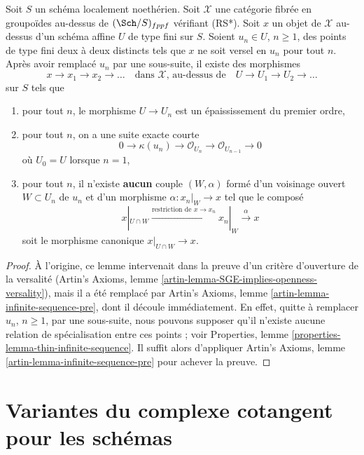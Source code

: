 \begin{lemma}
\label{lemma-infinite-sequence}
Soit $S$ un schéma localement noethérien. Soit $\mathcal{X}$ une catégorie
fibrée en groupoïdes au-dessus de $(\Sch/S)_{fppf}$ vérifiant (RS*).
Soit $x$ un objet de
$\mathcal{X}$ au-dessus d'un schéma affine $U$ de type fini sur $S$.
Soient $u_n \in U$, $n \geq 1$, des points de type fini deux à deux distincts
tels que $x$ ne soit versel en $u_n$ pour tout $n$. Après avoir remplacé
$u_n$ par une sous-suite, il existe des morphismes
$$
x \to x_1 \to x_2 \to \ldots
\quad\text{dans }\mathcal{X}\text{, au-dessus de}\quad
U \to U_1 \to U_2 \to \ldots
$$
sur $S$ tels que
\begin{enumerate}
\item pour tout $n$, le morphisme $U \to U_n$ est un épaississement
du premier ordre,
\item pour tout $n$, on a une suite exacte courte
$$
0 \to \kappa(u_n) \to \mathcal{O}_{U_n} \to \mathcal{O}_{U_{n - 1}} \to 0
$$
où $U_0 = U$ lorsque $n = 1$,
\item pour tout $n$, il n'existe {\bf aucun} couple $(W, \alpha)$
formé d'un voisinage ouvert $W \subset U_n$ de $u_n$
et d'un morphisme $\alpha : x_n|_W \to x$
tel que le composé
$$
x|_{U \cap W} \xrightarrow{\text{restriction de }x \to x_n}
x_n|_W \xrightarrow{\alpha} x
$$
soit le morphisme canonique $x|_{U \cap W} \to x$.
\end{enumerate}
\end{lemma}

\begin{proof}
À l'origine, ce lemme intervenait dans la preuve d'un critère
d'ouverture de la versalité
(Artin's Axioms, lemme \ref{artin-lemma-SGE-implies-openness-versality}),
mais il a été remplacé par Artin's Axioms,
lemme \ref{artin-lemma-infinite-sequence-pre}, dont il découle immédiatement.
En effet, quitte à remplacer $u_n$, $n \geq 1$, par une sous-suite,
nous pouvons supposer qu'il n'existe aucune relation de spécialisation
entre ces points ; voir Properties,
lemme \ref{properties-lemma-thin-infinite-sequence}.
Il suffit alors d'appliquer Artin's Axioms,
lemme \ref{artin-lemma-infinite-sequence-pre} pour achever la preuve.
\end{proof}




\section{Variantes du complexe cotangent pour les schémas}
\label{section-cotangent-schemes-variant}

